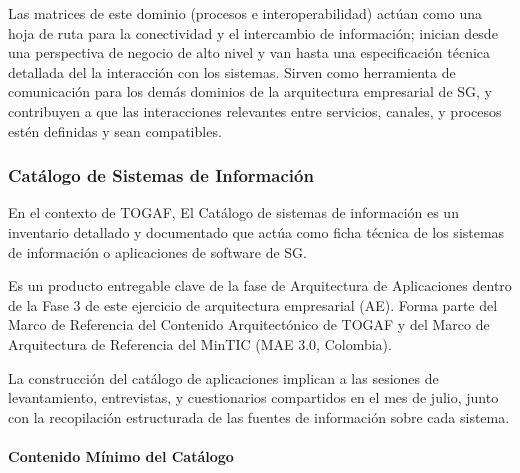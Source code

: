 \documentclass[
	a4paper, %
	12pt, %
]{include/CSSullivanBusinessReport}
\begin{document}
Las matrices de este dominio (procesos e interoperabilidad) actúan como
una hoja de ruta para la conectividad y el intercambio de información;
inician desde una perspectiva de negocio de alto nivel y van hasta una
especificación técnica detallada del la interacción con los sistemas.
Sirven como herramienta de comunicación para los demás dominios de la
arquitectura empresarial de SG, y contribuyen a que las interacciones
relevantes entre servicios, canales, y procesos estén definidas y sean
compatibles.

\subsubsection{Catálogo de Sistemas de
Información}\label{sec:catuxe1logo-de-sistemas-de-informaciuxf3n}

En el contexto de TOGAF, El Catálogo de sistemas de información es un
inventario detallado y documentado que actúa como ficha técnica de los
sistemas de información o aplicaciones de software de SG.

Es un producto entregable clave de la fase de Arquitectura de
Aplicaciones dentro de la Fase 3 de este ejercicio de arquitectura
empresarial (AE). Forma parte del Marco de Referencia del Contenido
Arquitectónico de TOGAF y del Marco de Arquitectura de Referencia del
MinTIC (MAE 3.0, Colombia).

La construcción del catálogo de aplicaciones implican a las sesiones de
levantamiento, entrevistas, y cuestionarios compartidos en el mes de
julio, junto con la recopilación estructurada de las fuentes de
información sobre cada sistema.

\paragraph{Contenido Mínimo del
Catálogo}\label{sec:contenido-muxednimo-del-catuxe1logo}
\end{document}
